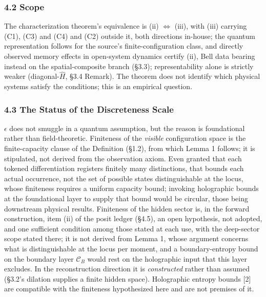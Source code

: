 \documentclass[
]{article}
\begin{document}
\hypertarget{scope}{%
\subsubsection{4.2 Scope}\label{scope}}

The characterization theorem's equivalence is (ii) \(\iff\) (iii), with
(iii) carrying (C1), (C3) and (C4) and (C2) outside it, both directions
in-house; the quantum representation follows for the source's
finite-configuration class, and directly observed memory effects in
open-system dynamics certify (ii), Bell data bearing instead on the
spatial-composite branch (§3.3); representability alone is strictly
weaker (diagonal-\(\hat{H}\), §3.4 Remark). The theorem does not
identify which physical systems satisfy the conditions; this is an
empirical question.

\hypertarget{the-status-of-the-discreteness-scale}{%
\subsubsection{4.3 The Status of the Discreteness
Scale}\label{the-status-of-the-discreteness-scale}}

\(\epsilon\) does not smuggle in a quantum assumption, but the reason is
foundational rather than field-theoretic. Finiteness of the
\emph{visible} configuration space is the finite-capacity clause of the
Definition (§1.2), from which Lemma 1 follows; it is stipulated, not
derived from the observation axiom. Even granted that each tokened
differentiation registers finitely many distinctions, that bounds each
actual occurrence, not the set of possible states distinguishable at the
locus, whose finiteness requires a uniform capacity bound; invoking
holographic bounds at the foundational layer to supply that bound would
be circular, those being downstream physical results. Finiteness of the
hidden sector is, in the forward construction, item (ii) of the posit
ledger (§4.5), an open hypothesis, not adopted, and one sufficient
condition among those stated at each use, with the deep-sector scope
stated there; it is not derived from Lemma 1, whose argument concerns
what is distinguishable at the locus per moment, and a boundary-entropy
bound on the boundary layer \(\mathcal{C}_B\) would rest on the
holographic input that this layer excludes. In the reconstruction
direction it is \emph{constructed} rather than assumed (§3.2's dilation
supplies a finite hidden space). Holographic entropy bounds {[}2{]} are
compatible with the finiteness hypothesized here and are not premises of
it.
\end{document}
